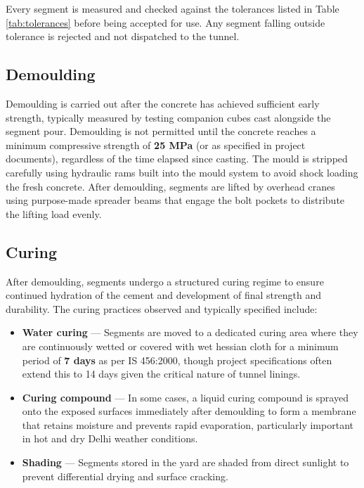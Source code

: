 \par\noindent
Every segment is measured and checked against the tolerances listed in Table \ref{tab:tolerances} before being accepted for use. Any segment falling outside tolerance is rejected and not dispatched to the tunnel.

\subsection{Demoulding}
\par\noindent
Demoulding is carried out after the concrete has achieved sufficient early strength, typically measured by testing companion cubes cast alongside the segment pour. Demoulding is not permitted until the concrete reaches a minimum compressive strength of \textbf{25 MPa} (or as specified in project documents), regardless of the time elapsed since casting. The mould is stripped carefully using hydraulic rams built into the mould system to avoid shock loading the fresh concrete. After demoulding, segments are lifted by overhead cranes using purpose-made spreader beams that engage the bolt pockets to distribute the lifting load evenly.

\subsection{Curing}
\par\noindent
After demoulding, segments undergo a structured curing regime to ensure continued hydration of the cement and development of final strength and durability. The curing practices observed and typically specified include:

\begin{itemize}
    \item \textbf{Water curing} --- Segments are moved to a dedicated curing area where they are continuously wetted or covered with wet hessian cloth for a minimum period of \textbf{7 days} as per IS 456:2000, though project specifications often extend this to 14 days given the critical nature of tunnel linings.
    \item \textbf{Curing compound} --- In some cases, a liquid curing compound is sprayed onto the exposed surfaces immediately after demoulding to form a membrane that retains moisture and prevents rapid evaporation, particularly important in hot and dry Delhi weather conditions.
    \item \textbf{Shading} --- Segments stored in the yard are shaded from direct sunlight to prevent differential drying and surface cracking.
\end{itemize}

